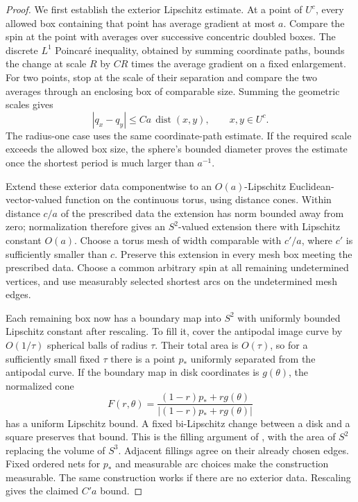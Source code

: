 \begin{proof}
We first establish the exterior Lipschitz estimate. At a point of
$U^c$, every allowed box containing that point has average gradient
at most $a$. Compare the spin at the point with averages over
successive concentric doubled boxes. The discrete $L^1$ Poincar\'e
inequality, obtained by summing coordinate paths, bounds the change
at scale $R$ by $CR$ times the average gradient on a fixed enlargement.
For two points, stop at the scale of their separation and compare the
two averages through an enclosing box of comparable size. Summing
the geometric scales gives
\[
 |q_x-q_y|\le Ca\,\operatorname{dist}(x,y),\qquad x,y\in U^c.
\]
The radius-one case uses the same coordinate-path estimate. If the
required scale exceeds the allowed box size, the sphere's bounded
diameter proves the estimate once the shortest period is much larger
than $a^{-1}$.

Extend these exterior data componentwise to an $O(a)$-Lipschitz
Euclidean-vector-valued function on the continuous torus, using
distance cones. Within distance $c/a$ of the prescribed data the
extension has norm bounded away from zero; normalization therefore
gives an $S^2$-valued extension there with Lipschitz constant $O(a)$.
Choose a torus mesh of width comparable with $c'/a$, where $c'$ is
sufficiently smaller than $c$. Preserve this extension in every mesh
box meeting the prescribed data. Choose a common arbitrary spin at
all remaining undetermined vertices, and use measurably selected
shortest arcs on the undetermined mesh edges.

Each remaining box now has a boundary map into $S^2$ with uniformly
bounded Lipschitz constant after rescaling. To fill it, cover the
antipodal image curve by $O(1/\tau)$ spherical balls of radius $\tau$.
Their total area is $O(\tau)$, so for a sufficiently small fixed $\tau$
there is a point $p_*$ uniformly separated from the antipodal curve.
If the boundary map in disk coordinates is $g(\theta)$, the normalized
cone
\[
 F(r,\theta)=
 \frac{(1-r)p_*+rg(\theta)}{|(1-r)p_*+rg(\theta)|}
\]
has a uniform Lipschitz bound. A fixed bi-Lipschitz change between a
disk and a square preserves that bound. This is the filling argument
of , with the area of $S^2$ replacing the volume of
$S^3$. Adjacent fillings agree on their already chosen edges. Fixed
ordered nets for $p_*$ and measurable arc choices make the construction
measurable. The same construction works if there are no exterior data.
Rescaling gives the claimed $C'a$ bound.


\end{proof}
